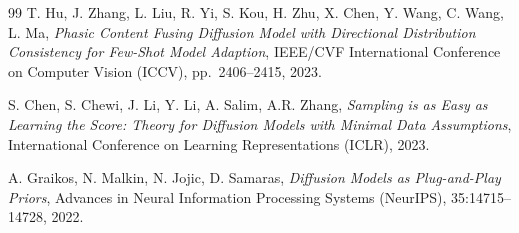 \documentclass[11pt,a4paper]{article}
\begin{document}
\begin{thebibliography}{99}
T. Hu, J. Zhang, L. Liu, R. Yi, S. Kou, H. Zhu, X. Chen, Y. Wang, C. Wang, L. Ma,
\emph{Phasic Content Fusing Diffusion Model with Directional Distribution Consistency for Few-Shot Model Adaption},
IEEE/CVF International Conference on Computer Vision (ICCV), pp.~2406--2415, 2023.

S. Chen, S. Chewi, J. Li, Y. Li, A. Salim, A.R. Zhang,
\emph{Sampling is as Easy as Learning the Score: Theory for Diffusion Models with Minimal Data Assumptions},
International Conference on Learning Representations (ICLR), 2023.

A. Graikos, N. Malkin, N. Jojic, D. Samaras,
\emph{Diffusion Models as Plug-and-Play Priors},
Advances in Neural Information Processing Systems (NeurIPS), 35:14715--14728, 2022.

\end{thebibliography}
\end{document}
